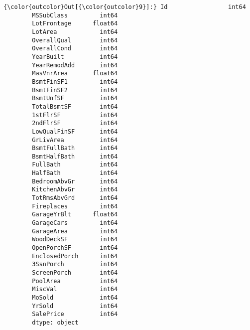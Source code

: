 \documentclass[11pt]{article}
\begin{document}
\begin{Verbatim}[commandchars=\\\{\}]
{\color{outcolor}Out[{\color{outcolor}9}]:} Id                 int64
        MSSubClass         int64
        LotFrontage      float64
        LotArea            int64
        OverallQual        int64
        OverallCond        int64
        YearBuilt          int64
        YearRemodAdd       int64
        MasVnrArea       float64
        BsmtFinSF1         int64
        BsmtFinSF2         int64
        BsmtUnfSF          int64
        TotalBsmtSF        int64
        1stFlrSF           int64
        2ndFlrSF           int64
        LowQualFinSF       int64
        GrLivArea          int64
        BsmtFullBath       int64
        BsmtHalfBath       int64
        FullBath           int64
        HalfBath           int64
        BedroomAbvGr       int64
        KitchenAbvGr       int64
        TotRmsAbvGrd       int64
        Fireplaces         int64
        GarageYrBlt      float64
        GarageCars         int64
        GarageArea         int64
        WoodDeckSF         int64
        OpenPorchSF        int64
        EnclosedPorch      int64
        3SsnPorch          int64
        ScreenPorch        int64
        PoolArea           int64
        MiscVal            int64
        MoSold             int64
        YrSold             int64
        SalePrice          int64
        dtype: object
\end{Verbatim}
            

    
    
    
    
\end{document}
